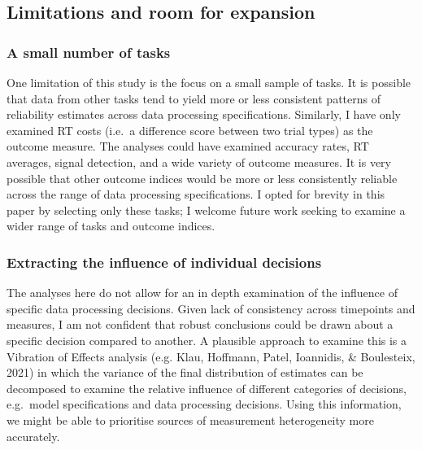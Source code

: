 \documentclass[
  man,floatsintext]{apa6}
\begin{document}
\hypertarget{limitations-and-room-for-expansion}{%
\subsection{Limitations and room for expansion}\label{limitations-and-room-for-expansion}}

\hypertarget{a-small-number-of-tasks}{%
\subsubsection{A small number of tasks}\label{a-small-number-of-tasks}}

One limitation of this study is the focus on a small sample of tasks. It is possible that data from other tasks tend to yield more or less consistent patterns of reliability estimates across data processing specifications. Similarly, I have only examined RT costs (i.e.~a difference score between two trial types) as the outcome measure. The analyses could have examined accuracy rates, RT averages, signal detection, and a wide variety of outcome measures. It is very possible that other outcome indices would be more or less consistently reliable across the range of data processing specifications. I opted for brevity in this paper by selecting only these tasks; I welcome future work seeking to examine a wider range of tasks and outcome indices.

\hypertarget{extracting-the-influence-of-individual-decisions}{%
\subsubsection{Extracting the influence of individual decisions}\label{extracting-the-influence-of-individual-decisions}}

The analyses here do not allow for an in depth examination of the influence of specific data processing decisions. Given lack of consistency across timepoints and measures, I am not confident that robust conclusions could be drawn about a specific decision compared to another. A plausible approach to examine this is a Vibration of Effects analysis (e.g. Klau, Hoffmann, Patel, Ioannidis, \& Boulesteix, 2021) in which the variance of the final distribution of estimates can be decomposed to examine the relative influence of different categories of decisions, e.g.~model specifications and data processing decisions. Using this information, we might be able to prioritise sources of measurement heterogeneity more accurately.
\end{document}
